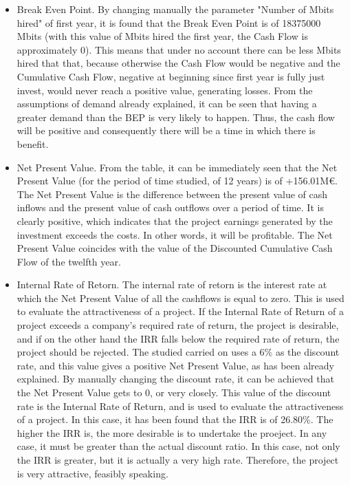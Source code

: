 \begin{itemize}
\item Break Even Point. By changing manually the parameter "Number of Mbits hired" of first year, it is found that the Break Even Point is of 18375000 Mbits (with this value of Mbits hired the first year, the Cash Flow is approximately 0). This means that under no account there can be less Mbits hired that that, because otherwise the Cash Flow would be negative and the Cumulative Cash Flow, negative at beginning since first year is fully just invest, would never reach a positive value, generating losses. From the assumptions of demand already explained, it can be seen that having a greater demand than the BEP is very likely to happen. Thus, the cash flow will be positive and consequently there will be a time in which there is benefit.

\item Net Present Value. From the table, it can be immediately seen that the Net Present Value (for the period of time studied, of 12 years) is of +156.01M\euro. The Net Present Value is the difference between the present value of cash inflows and the present value of cash outflows over a period of time. It is clearly positive, which indicates that the project earnings generated by the investment exceeds the costs. In other words, it will be profitable. The Net Present Value coincides with the value of the Discounted Cumulative Cash Flow of the twelfth year. 


\item Internal Rate of Retorn. The internal rate of retorn is the interest rate at which the Net Present Value of all the cashflows is equal to zero. This is used to evaluate the attractiveness of a project. If the Internal Rate of Return of a project exceeds a company's required rate of return, the project is desirable, and if on the other hand the IRR falls below the required rate of return, the project should be rejected. The studied carried on uses a 6\% as the discount rate, and this value gives a positive Net Present Value, as has been already explained. By manually changing the discount rate, it can be achieved that the Net Present Value gets to 0, or very closely. This value of the discount rate is the Internal Rate of Return, and is used to evaluate the attractiveness of a project. In this case, it has been found that the IRR is of 26.80\%. The higher the IRR is, the more desirable is to undertake the proeject. In any case, it must be greater than the actual discount ratio. In this case, not only the IRR is greater, but it is actually a very high rate. Therefore, the project is very attractive, feasibly speaking. 

\end{itemize}


